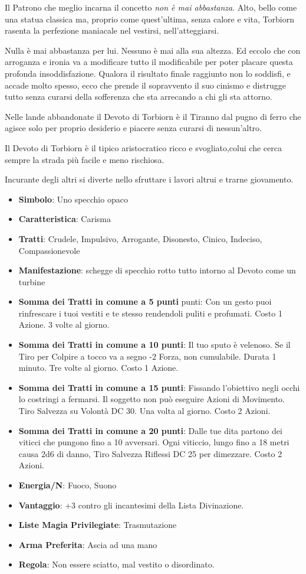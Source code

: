 \begin{multicols}{2}
Il Patrono che meglio incarna il concetto \emph{non è mai abbastanza}. Alto, bello come una statua classica ma, proprio come quest'ultima, senza calore e vita, Torbiorn rasenta la perfezione maniacale nel vestirsi, nell'atteggiarsi.

Nulla è mai abbastanza per lui. Nessuno è mai alla sua altezza. Ed eccolo che con arroganza e ironia va a modificare tutto il modificabile per poter placare questa profonda insoddisfazione. Qualora il risultato finale raggiunto non lo soddisfi, e accade molto spesso, ecco che prende il sopravvento il suo cinismo e distrugge tutto senza curarsi della sofferenza che sta arrecando a chi gli sta attorno.

Nelle lande abbandonate il Devoto di Torbiorn è il Tiranno dal pugno di ferro che agisce solo per proprio desiderio e piacere senza curarsi di nessun'altro.

Il Devoto di Torbiorn è il tipico aristocratico ricco e svogliato,colui che cerca sempre la strada più facile e meno rischiosa.

Incurante degli altri si diverte nello sfruttare i lavori altrui e trarne giovamento.

\begin{itemize}[leftmargin=*] \setlength{\itemsep}{0pt}
\item \textbf{Simbolo}: Uno specchio opaco
\item \textbf{Caratteristica}: Carisma
\item \textbf{Tratti}: Crudele, Impulsivo, Arrogante, Disonesto, Cinico, Indeciso, Compassionevole
\item \textbf{Manifestazione}: schegge di specchio rotto tutto intorno al Devoto come un turbine
\item \textbf{Somma dei Tratti in comune a 5 punti} punti: Con un gesto puoi rinfrescare i tuoi vestiti e te stesso rendendoli puliti e profumati. Costo 1 Azione. 3 volte al giorno.
\item \textbf{Somma dei Tratti in comune a 10 punti}: Il tuo sputo è velenoso. Se il Tiro per Colpire a tocco va a segno -2 Forza, non cumulabile. Durata 1 minuto. Tre volte al giorno. Costo 1 Azione.
\item \textbf{Somma dei Tratti in comune a 15 punti}: Fissando l'obiettivo negli occhi lo costringi a fermarsi. Il soggetto non può eseguire Azioni di Movimento. Tiro Salvezza su Volontà DC 30. Una volta al giorno. Costo 2 Azioni.
\item \textbf{Somma dei Tratti in comune a 20 punti}: Dalle tue dita partono dei viticci che pungono fino a 10 avversari. Ogni viticcio, lungo fino a 18 metri causa 2d6 di danno, Tiro Salvezza Riflessi DC 25 per dimezzare. Costo 2 Azioni.
\item \textbf{Energia/N}: Fuoco, Suono
\item \textbf{Vantaggio}: +3 contro gli incantesimi della Lista Divinazione.
\item \textbf{Liste Magia Privilegiate}: Trasmutazione
\item \textbf{Arma Preferita}: Ascia ad una mano
\item \textbf{Regola}: Non essere sciatto, mal vestito o disordinato.
\end{itemize}



\end{multicols}
